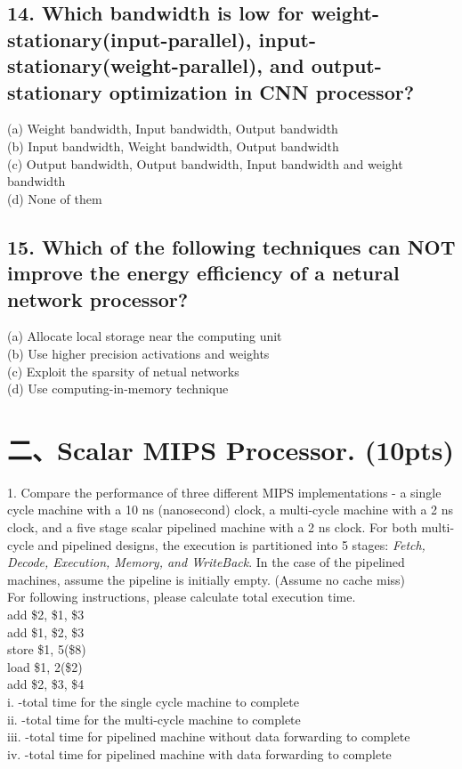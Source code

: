 \documentclass[UTF8]{ctexart}
\begin{document}
\subsection*{14. Which bandwidth is {\bfseries low} for weight-stationary(input-parallel), input-stationary(weight-parallel), and output-stationary optimization in CNN processor?}
(a) Weight bandwidth, Input bandwidth, Output bandwidth\\
(b) Input bandwidth, Weight bandwidth, Output bandwidth\\
(c) Output bandwidth, Output bandwidth, Input bandwidth and weight bandwidth\\
(d) None of them\\

\subsection*{15. Which of the following techniques can NOT improve the energy efficiency of a netural network processor?}
(a) Allocate local storage near the computing unit\\
(b) Use higher precision activations and weights\\
(c) Exploit the sparsity of netual networks\\
(d) Use computing-in-memory technique\\

\section*{二、Scalar MIPS Processor. (10pts)}
1. Compare the performance of three different MIPS implementations - a single cycle machine with a 10 ns (nanosecond) clock, a multi-cycle machine with a 2 ns 
clock, and a five stage scalar pipelined machine with a 2 ns clock. For both multi-cycle and pipelined designs, the execution is partitioned into 5 stages: \textit{Fetch, 
Decode, Execution, Memory, and WriteBack}. In the case of the pipelined machines, assume the pipeline is initially empty. (Assume no cache miss)\\
For following instructions, please calculate total execution time.\\
add \$2, \$1, \$3\\
add \$1, \$2, \$3\\
store \$1, 5(\$8)\\
load \$1, 2(\$2)\\
add \$2, \$3, \$4\\
i. -total time for the single cycle machine to complete\\
ii. -total time for the multi-cycle machine to complete\\
iii. -total time for pipelined machine without data forwarding to complete\\
iv. -total time for pipelined machine with data forwarding to complete\\
\end{document}
